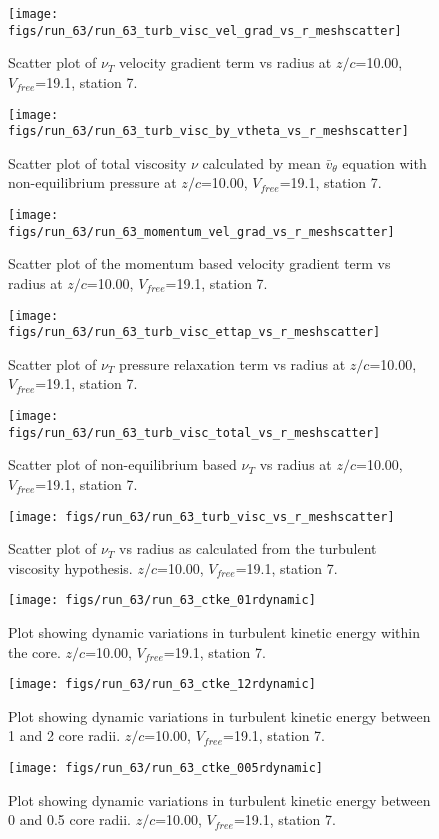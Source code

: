 \begin{figure}[H]
\centering
\texttt{[image: figs/run\_63/run\_63\_turb\_visc\_vel\_grad\_vs\_r\_meshscatter]}
\caption{Scatter plot of $\nu_T$ velocity gradient term vs radius at $z/c$=10.00, $V_{free}$=19.1, station 7.}
\end{figure}


\begin{figure}[H]
\centering
\texttt{[image: figs/run\_63/run\_63\_turb\_visc\_by\_vtheta\_vs\_r\_meshscatter]}
\caption{Scatter plot of total viscosity $\nu$ calculated by mean $\bar{v}_{\theta}$ equation with non-equilibrium pressure at $z/c$=10.00, $V_{free}$=19.1, station 7.}
\end{figure}


\begin{figure}[H]
\centering
\texttt{[image: figs/run\_63/run\_63\_momentum\_vel\_grad\_vs\_r\_meshscatter]}
\caption{Scatter plot of the momentum based velocity gradient term vs radius at $z/c$=10.00, $V_{free}$=19.1, station 7.}
\end{figure}


\begin{figure}[H]
\centering
\texttt{[image: figs/run\_63/run\_63\_turb\_visc\_ettap\_vs\_r\_meshscatter]}
\caption{Scatter plot of $\nu_T$ pressure relaxation term vs radius at $z/c$=10.00, $V_{free}$=19.1, station 7.}
\end{figure}


\begin{figure}[H]
\centering
\texttt{[image: figs/run\_63/run\_63\_turb\_visc\_total\_vs\_r\_meshscatter]}
\caption{Scatter plot of non-equilibrium based $\nu_T$ vs radius at $z/c$=10.00, $V_{free}$=19.1, station 7.}
\end{figure}


\begin{figure}[H]
\centering
\texttt{[image: figs/run\_63/run\_63\_turb\_visc\_vs\_r\_meshscatter]}
\caption{Scatter plot of $\nu_T$ vs radius as calculated from the turbulent viscosity hypothesis. $z/c$=10.00, $V_{free}$=19.1, station 7.}
\end{figure}


\begin{figure}[H]
\centering
\texttt{[image: figs/run\_63/run\_63\_ctke\_01rdynamic]}
\caption{Plot showing dynamic variations in turbulent kinetic energy within the core. $z/c$=10.00, $V_{free}$=19.1, station 7.}
\end{figure}


\begin{figure}[H]
\centering
\texttt{[image: figs/run\_63/run\_63\_ctke\_12rdynamic]}
\caption{Plot showing dynamic variations in turbulent kinetic energy between 1 and 2 core radii. $z/c$=10.00, $V_{free}$=19.1, station 7.}
\end{figure}


\begin{figure}[H]
\centering
\texttt{[image: figs/run\_63/run\_63\_ctke\_005rdynamic]}
\caption{Plot showing dynamic variations in turbulent kinetic energy between 0 and 0.5 core radii. $z/c$=10.00, $V_{free}$=19.1, station 7.}
\end{figure}


